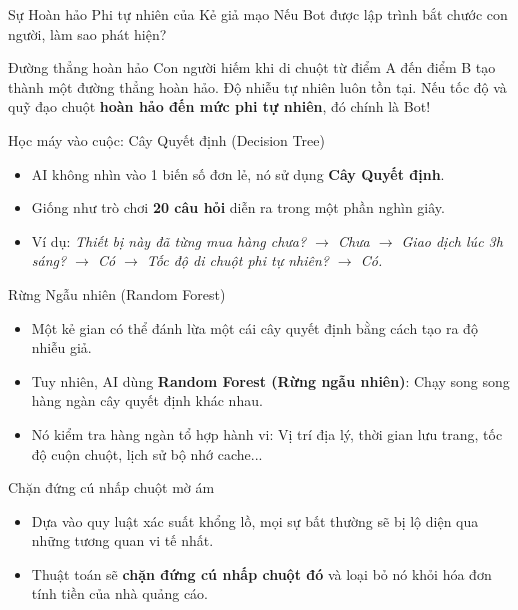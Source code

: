 \documentclass[aspectratio=169]{beamer}
\begin{document}
\begin{frame}{Sự Hoàn hảo Phi tự nhiên của Kẻ giả mạo}
    Nếu Bot được lập trình bắt chước con người, làm sao phát hiện?
    \begin{alertblock}{Đường thẳng hoàn hảo}
        Con người hiếm khi di chuột từ điểm A đến điểm B tạo thành một đường thẳng hoàn hảo. Độ nhiễu tự nhiên luôn tồn tại. Nếu tốc độ và quỹ đạo chuột \textbf{hoàn hảo đến mức phi tự nhiên}, đó chính là Bot!
    \end{alertblock}
\end{frame}

\begin{frame}{Học máy vào cuộc: Cây Quyết định (Decision Tree)}
    \begin{itemize}
        \item AI không nhìn vào 1 biến số đơn lẻ, nó sử dụng \textbf{Cây Quyết định}.
        \item Giống như trò chơi \textbf{20 câu hỏi} diễn ra trong một phần nghìn giây.
        \item Ví dụ: \textit{Thiết bị này đã từng mua hàng chưa? $\rightarrow$ Chưa $\rightarrow$ Giao dịch lúc 3h sáng? $\rightarrow$ Có $\rightarrow$ Tốc độ di chuột phi tự nhiên? $\rightarrow$ Có.}
    \end{itemize}
\end{frame}

\begin{frame}{Rừng Ngẫu nhiên (Random Forest)}
    \begin{itemize}
        \item Một kẻ gian có thể đánh lừa một cái cây quyết định bằng cách tạo ra độ nhiễu giả.
        \item Tuy nhiên, AI dùng \textbf{Random Forest (Rừng ngẫu nhiên)}: Chạy song song hàng ngàn cây quyết định khác nhau.
        \item Nó kiểm tra hàng ngàn tổ hợp hành vi: Vị trí địa lý, thời gian lưu trang, tốc độ cuộn chuột, lịch sử bộ nhớ cache...
    \end{itemize}
\end{frame}

\begin{frame}{Chặn đứng cú nhấp chuột mờ ám}
    \begin{itemize}
        \item Dựa vào quy luật xác suất khổng lồ, mọi sự bất thường sẽ bị lộ diện qua những tương quan vi tế nhất.
        \item Thuật toán sẽ \textbf{chặn đứng cú nhấp chuột đó} và loại bỏ nó khỏi hóa đơn tính tiền của nhà quảng cáo.
    \end{itemize}
\end{frame}
\end{document}
